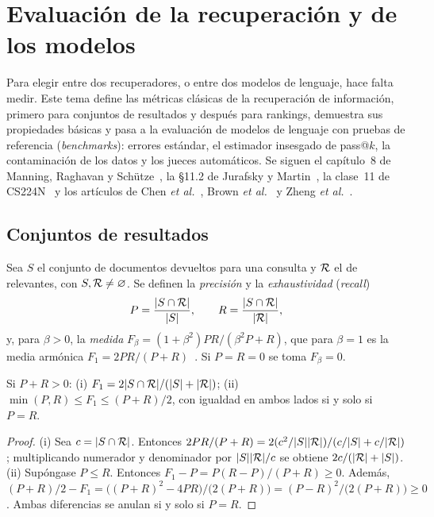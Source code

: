 \chapter{Evaluación de la recuperación y de los modelos}
\label{tema:3}

Para elegir entre dos recuperadores, o entre dos modelos de lenguaje, hace falta medir. Este tema define las métricas clásicas de la recuperación de información, primero para conjuntos de resultados y después para rankings, demuestra sus propiedades básicas y pasa a la evaluación de modelos de lenguaje con pruebas de referencia (\emph{benchmarks}): errores estándar, el estimador insesgado de pass@$k$, la contaminación de los datos y los jueces automáticos. Se siguen el capítulo~8 de Manning, Raghavan y Schütze~\cite{iir}, la §11.2 de Jurafsky y Martin~\cite{jm3}, la clase~11 de CS224N~\cite{cs224n} y los artículos de Chen \emph{et al.}~\cite{chen-codex}, Brown \emph{et al.}~\cite{brown} y Zheng \emph{et al.}~\cite{zheng}.

\section{Conjuntos de resultados}

\begin{definicion}\label{def:pr}
Sea $S$ el conjunto de documentos devueltos para una consulta y $\mathcal{R}$ el de relevantes, con $S,\mathcal{R}\ne\varnothing$. Se definen la \emph{precisión} y la \emph{exhaustividad} (\emph{recall})
\[
P=\frac{\lvert S\cap\mathcal{R}\rvert}{\lvert S\rvert},\qquad R=\frac{\lvert S\cap\mathcal{R}\rvert}{\lvert\mathcal{R}\rvert},
\]
y, para $\beta>0$, la \emph{medida} $F_\beta=(1+\beta^{2})PR/(\beta^{2}P+R)$, que para $\beta=1$ es la media armónica $F_1=2PR/(P+R)$~\cite[§8.3]{iir}. Si $P=R=0$ se toma $F_\beta=0$.
\end{definicion}

\begin{proposicion}[Propiedades de $F_1$]\label{prop:f1}
Si $P+R>0$: (i) $F_1=2\lvert S\cap\mathcal{R}\rvert/(\lvert S\rvert+\lvert\mathcal{R}\rvert)$; (ii) $\min(P,R)\le F_1\le (P+R)/2$, con igualdad en ambos lados si y solo si $P=R$.
\end{proposicion}

\begin{proof}
(i) Sea $c=\lvert S\cap\mathcal{R}\rvert$. Entonces $2PR/(P+R)=2(c^{2}/\lvert S\rvert\lvert\mathcal{R}\rvert)/(c/\lvert S\rvert+c/\lvert\mathcal{R}\rvert)$; multiplicando numerador y denominador por $\lvert S\rvert\lvert\mathcal{R}\rvert/c$ se obtiene $2c/(\lvert\mathcal{R}\rvert+\lvert S\rvert)$. (ii) Supóngase $P\le R$. Entonces $F_1-P=P(R-P)/(P+R)\ge 0$. Además, $(P+R)/2-F_1=\bigl((P+R)^{2}-4PR\bigr)/\bigl(2(P+R)\bigr)=(P-R)^{2}/\bigl(2(P+R)\bigr)\ge 0$. Ambas diferencias se anulan si y solo si $P=R$.
\end{proof}

